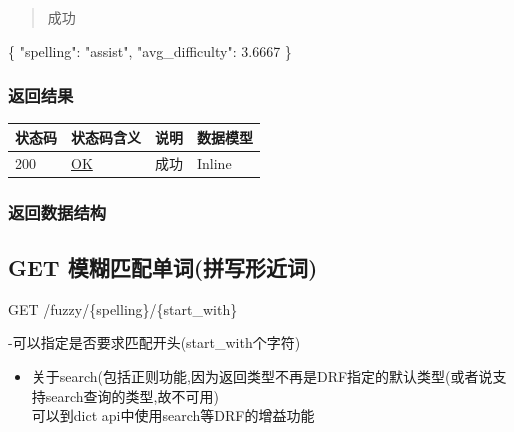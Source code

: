 \documentclass[
]{article}
\newenvironment{Shaded}{}{}
\newcommand{\DataTypeTok}[1]{\textcolor[rgb]{0.56,0.13,0.00}{#1}}
\newcommand{\FloatTok}[1]{\textcolor[rgb]{0.25,0.63,0.44}{#1}}
\newcommand{\FunctionTok}[1]{\textcolor[rgb]{0.02,0.16,0.49}{#1}}
\newcommand{\StringTok}[1]{\textcolor[rgb]{0.25,0.44,0.63}{#1}}
\begin{document}
\begin{quote}
成功
\end{quote}

\begin{Shaded}
\begin{Highlighting}[]
\FunctionTok{\{}
  \DataTypeTok{"spelling"}\FunctionTok{:} \StringTok{"assist"}\FunctionTok{,}
  \DataTypeTok{"avg\_difficulty"}\FunctionTok{:} \FloatTok{3.6667}
\FunctionTok{\}}
\end{Highlighting}
\end{Shaded}

\hypertarget{ux8fd4ux56deux7ed3ux679c-4}{%
\subsubsection{返回结果}\label{ux8fd4ux56deux7ed3ux679c-4}}

\begin{longtable}[]{@{}llll@{}}
\toprule
状态码 & 状态码含义 & 说明 & 数据模型 \\
\midrule
\endhead
200 & \href{https://tools.ietf.org/html/rfc7231\#section-6.3.1}{OK} &
成功 & Inline \\
\bottomrule
\end{longtable}

\hypertarget{ux8fd4ux56deux6570ux636eux7ed3ux6784-4}{%
\subsubsection{返回数据结构}\label{ux8fd4ux56deux6570ux636eux7ed3ux6784-4}}

\hypertarget{get-ux6a21ux7ccaux5339ux914dux5355ux8bcdux62fcux5199ux5f62ux8fd1ux8bcd}{%
\subsection{GET
模糊匹配单词(拼写形近词)}\label{get-ux6a21ux7ccaux5339ux914dux5355ux8bcdux62fcux5199ux5f62ux8fd1ux8bcd}}

GET /fuzzy/\{spelling\}/\{start\_with\}

-可以指定是否要求匹配开头(start\_with个字符)

\begin{itemize}
\item
  关于search(包括正则功能,因为返回类型不再是DRF指定的默认类型(或者说支持search查询的类型,故不可用)\\
  可以到dict api中使用search等DRF的增益功能
\end{itemize}
\end{document}

